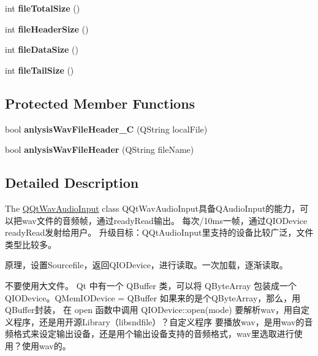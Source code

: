 \begin{DoxyCompactItemize}
int {\bfseries file\+Total\+Size} ()
\item 
\mbox{\label{class_q_qt_wav_audio_input_a169b0b78547b4d927db8a13554179be8}} 
int {\bfseries file\+Header\+Size} ()
\item 
\mbox{\label{class_q_qt_wav_audio_input_aac9dbb88ad60c53bb59391f763cac8cb}} 
int {\bfseries file\+Data\+Size} ()
\item 
\mbox{\label{class_q_qt_wav_audio_input_aaae2e966e79231aa5199101c8b7b30e8}} 
int {\bfseries file\+Tail\+Size} ()
\end{DoxyCompactItemize}
\subsection*{Protected Member Functions}
\begin{DoxyCompactItemize}
\item 
\mbox{\label{class_q_qt_wav_audio_input_aab3d5ae09ef1f74f73d555716835bc4f}} 
bool {\bfseries anlysis\+Wav\+File\+Header\+\_\+C} (Q\+String local\+File)
\item 
\mbox{\label{class_q_qt_wav_audio_input_a543a98b9ca655f1bcb565af36ca56d03}} 
bool {\bfseries anlysis\+Wav\+File\+Header} (Q\+String file\+Name)
\end{DoxyCompactItemize}


\subsection{Detailed Description}
The \mbox{\hyperlink{class_q_qt_wav_audio_input}{Q\+Qt\+Wav\+Audio\+Input}} class Q\+Qt\+Wav\+Audio\+Input具备\+Q\+Audio\+Input的能力，可以把wav文件的音频帧，通过ready\+Read输出。 每次/10ms一帧，通过\+Q\+I\+O\+Device ready\+Read发射给用户。 升级目标：\+Q\+Qt\+Audio\+Input里支持的设备比较广泛，文件类型比较多。 

原理，设置\+Sourcefile，返回\+Q\+I\+O\+Device，进行读取。一次加载，逐渐读取。

不要使用大文件。 Qt 中有一个 Q\+Buffer 类，可以将 Q\+Byte\+Array 包装成一个 Q\+I\+O\+Device。\+Q\+Mem\+I\+O\+Device = Q\+Buffer 如果来的是个\+Q\+Byte\+Array，那么，用\+Q\+Buffer封装， 在 open 函数中调用 Q\+I\+O\+Device\+::open(mode) 要解析wav，用自定义程序，还是用开源\+Library（libsndfile）？自定义程序 要播放wav，是用wav的音频格式来设定输出设备，还是用个输出设备支持的音频格式，wav里选取进行使用？使用wav的。

